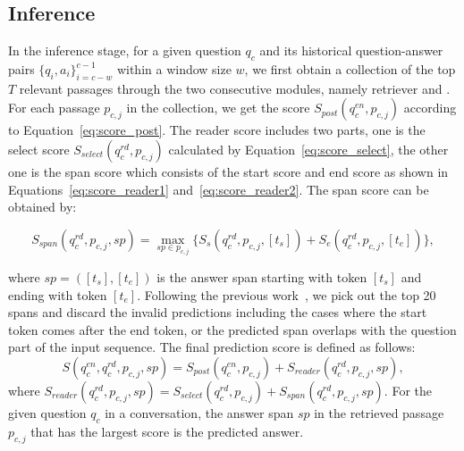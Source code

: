    
\subsection{Inference}\label{subsec:inference}
In the inference stage, for a given question $q_c$ and its historical question-answer pairs $\{q_i, a_i\}_{i=c-w}^{c-1}$ within a window size $w$, we first obtain a collection of the top $T$ relevant passages through the two consecutive modules, namely retriever and {\rerankname}. For each passage $p_{c,j}$ in the collection, we get the {\rerankname} score $S_{post}(q_c^{en},p_{c,j})$ according to Equation~\ref{eq:score_post}. The reader score includes two parts, one is the select score $S_{select}(q_{c}^{rd},p_{c,j})$ calculated by Equation~\ref{eq:score_select}, the other one is the span score which consists of the start score and end score as shown in Equations~\ref{eq:score_reader1} and~\ref{eq:score_reader2}. The span score can be obtained by:
\begin{footnotesize}
\begin{equation}
    S_{span}(q_{c}^{rd},p_{c,j},sp)=\max\limits_{sp\in p_{c,j}}\{ S_{s}(q_{c}^{rd},p_{c,j},[t_s])+ S_{e}(q_{c}^{rd},p_{c,j},[t_e])\},
\end{equation}
\end{footnotesize}
where $sp=([t_s],[t_e])$ is the answer span starting with token $[t_s]$ and ending with token $[t_e]$. Following the previous work~\cite{kenton2019bert,qu2020open},  we pick out the top 20 spans and discard the invalid predictions including the cases where the start token comes after the end token, or the predicted span overlaps with the question part of the input sequence. The final prediction score is defined as follows:
\begin{equation}
    S(q_{c}^{en},q_{c}^{rd},p_{c,j},sp) = S_{post}(q_c^{en},p_{c,j}) + S_{reader}(q_{c}^{rd},p_{c,j}, sp),
\end{equation}
where $S_{reader}(q_{c}^{rd},p_{c,j},sp) = S_{select}(q_{c}^{rd},p_{c,j}) + S_{span}(q_{c}^{rd},p_{c,j},sp)$. For the given question $q_c$ in a conversation, the answer span $sp$ in the retrieved passage $p_{c,j}$ that has the largest score is the predicted answer. 